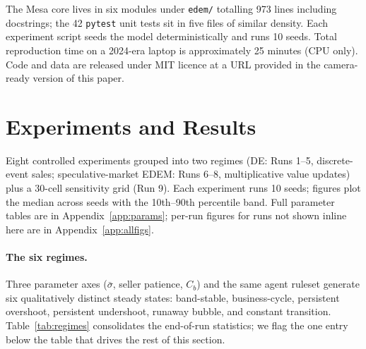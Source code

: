 \documentclass{article}
\begin{document}
The Mesa core lives in six modules under \texttt{edem/} totalling
973 lines including docstrings; the 42 \texttt{pytest} unit tests
sit in five files of similar density. Each experiment script seeds
the model deterministically and runs 10 seeds. Total reproduction
time on a 2024-era laptop is approximately 25 minutes (CPU only).
Code and data are released under MIT licence at a URL provided in
the camera-ready version of this paper.

\section{Experiments and Results}
\label{sec:experiments}

Eight controlled experiments grouped into two regimes (DE: Runs 1--5,
discrete-event sales; speculative-market EDEM: Runs 6--8,
multiplicative value updates) plus a 30-cell sensitivity grid
(Run 9). Each experiment runs 10 seeds; figures plot the median
across seeds with the 10th--90th percentile band. Full parameter
tables are in Appendix~\ref{app:params}; per-run figures for runs
not shown inline here are in Appendix~\ref{app:allfigs}.

\paragraph{The six regimes.} Three parameter axes
($\bar\sigma$, seller patience, $C_b$) and the same agent ruleset
generate six qualitatively distinct steady states: band-stable,
business-cycle, persistent overshoot, persistent undershoot,
runaway bubble, and constant transition.
Table~\ref{tab:regimes} consolidates the end-of-run statistics; we
flag the one entry below the table that drives the rest of this
section.
\end{document}
